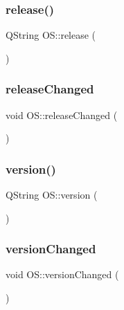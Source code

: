 \mbox{\label{classOS_a1d00cd418f5d83cc174492326f7cd604}} 
\subsubsection{\texorpdfstring{release()}{release()}}
{\footnotesize\ttfamily Q\+String O\+S\+::release (\begin{DoxyParamCaption}{ }\end{DoxyParamCaption})}

\mbox{\label{classOS_a58369b88b24b1701b020bd0971d99c03}} 
\subsubsection{\texorpdfstring{release\+Changed}{releaseChanged}}
{\footnotesize\ttfamily void O\+S\+::release\+Changed (\begin{DoxyParamCaption}{ }\end{DoxyParamCaption})\hspace{0.3cm}{\ttfamily [signal]}}

\mbox{\label{classOS_a4cd043becb244d8f40bdcc55c0417a71}} 
\subsubsection{\texorpdfstring{version()}{version()}}
{\footnotesize\ttfamily Q\+String O\+S\+::version (\begin{DoxyParamCaption}{ }\end{DoxyParamCaption})}

\mbox{\label{classOS_a2bb282eb19c9eaa0c787dabc434a9fca}} 
\subsubsection{\texorpdfstring{version\+Changed}{versionChanged}}
{\footnotesize\ttfamily void O\+S\+::version\+Changed (\begin{DoxyParamCaption}{ }\end{DoxyParamCaption})\hspace{0.3cm}{\ttfamily [signal]}}

